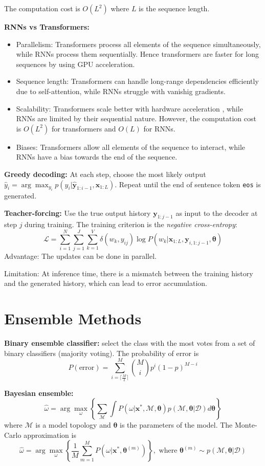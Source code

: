 \documentclass[12pt]{article}
\begin{document}
The computation cost is $O(L^2)$ where $L$ is the sequence length.

\textbf{RNNs vs Transformers:}
\begin{itemize}
    \item Parallelism: Transformers process all elements of the sequence simultaneously, while RNNs process them sequentially. Hence transformers are faster for long sequences by using GPU acceleration.
    \item Sequence length: Transformers can handle long-range dependencies efficiently due to self-attention, while RNNs struggle with vanishig gradients.
    \item Scalability: Transformers scale better with hardware acceleration , while RNNs are limited by their sequential nature. However, the computation cost is $O(L^2)$ for transformers and $O(L)$ for RNNs.
    \item Biases: Transformers allow all elements of the sequence to interact, while RNNs have a bias towards the end of the sequence.
\end{itemize}

\textbf{Greedy decoding:} At each step, choose the most likely output $\hat{y}_i = \arg\max_{y_i} p(y_i | \hat{\boldsymbol{y}}_{1:i-1}, \boldsymbol{x}_{1:L})$. 
Repeat until the end of sentence token \texttt{eos} is generated.

\textbf{Teacher-forcing:} Use the true output history $\boldsymbol{y}_{1:j-1}$ as input to the decoder at step $j$ during training. The training criterion is the \textit{negative cross-entropy}:
$$
\mathcal{L} = \sum_{i=1}^N \sum_{j=1}^J \sum_{k=1}^V \delta(w_k, y_{ij}) \log P(w_k | \boldsymbol{x}_{1:L}, \boldsymbol{y}_{i, 1:j-1}, \boldsymbol{\theta})
$$
Advantage: The updates can be done in parallel.

Limitation: At inference time, there is a mismatch between the training history and the generated history, which can lead to error accumulation.

\section{Ensemble Methods}
\textbf{Binary ensemble classifier:} select the class with the most votes from a set of binary classifiers (majority voting). The probability of error is
$$
P(\text{error}) = \sum_{i=\lceil \frac{M}{2} \rceil}^M \binom{M}{i} p^i (1-p)^{M-i}
$$

\textbf{Bayesian ensemble:}
$$
\hat{\omega} = \arg\max_{\omega} \left\{ \sum_{\mathcal{M}} \int P(\omega | \boldsymbol{x}^*, \mathcal{M}, \boldsymbol{\theta}) p(\mathcal{M}, \boldsymbol{\theta} | \mathcal{D}) d\boldsymbol{\theta} \right\}
$$
where $\mathcal{M}$ is a model topology and $\boldsymbol{\theta}$ is the parameters of the model. The Monte-Carlo approximation is
$$
\hat{\omega} = \arg\max_{\omega} \left\{ \frac{1}{M}\sum_{m=1}^M P(\omega | \boldsymbol{x}^*, \boldsymbol{\theta}^{(m)}) \right\}, \text{ where } \boldsymbol{\theta}^{(m)} \sim p(\mathcal{M}, \boldsymbol{\theta} | \mathcal{D})
$$
\end{document}
